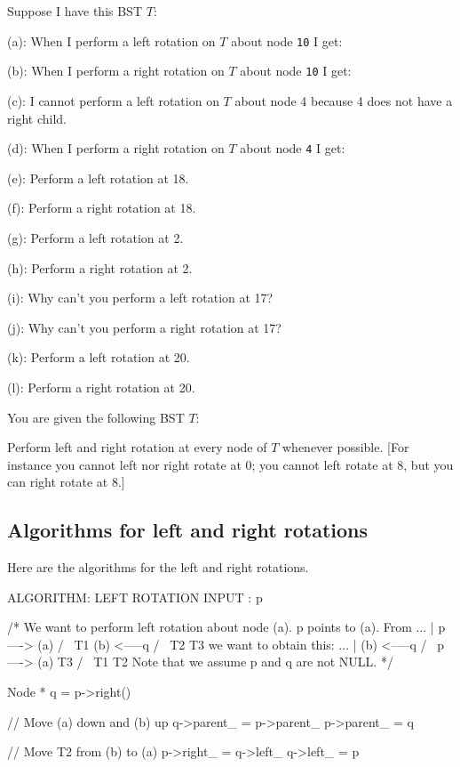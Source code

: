 \begin{eg}
  Suppose I have this BST $T$:
  
  
(a):
When I perform a left rotation on $T$ about node \verb!10! I get:
  

(b):
When I perform a right rotation on $T$ about node \verb!10! I get:
  

(c): I cannot perform a left rotation on $T$ about
node 4 because 4 does not have a right child.

(d):
When I perform a right rotation on $T$ about node \verb!4! I get:


(e): Perform a left rotation at 18.

(f): Perform a right rotation at 18.

(g): Perform a left rotation at 2.

(h): Perform a right rotation at 2.

(i): Why can't you perform a left rotation at 17?

(j): Why can't you perform a right rotation at 17?

(k): Perform a left rotation at 20.

(l): Perform a right rotation at 20.

\end{eg}

\newpage
\begin{ex}
  You are given the following BST $T$:
  
  
Perform left and right rotation at every node of $T$ whenever possible.
[For instance you cannot left nor right rotate at 0; you cannot left rotate at 8, but you can right rotate at 8.] 
\end{ex}



\newpage
\subsection{Algorithms for left and right rotations}

Here are the algorithms for the left and right rotations.

{\small
\begin{console}
ALGORITHM: LEFT ROTATION
INPUT    : p

/* We want to perform left rotation about node (a). p points
to (a). From
                   ...
                    |
            p----> (a)
                   / \
                 T1  (b) <-----q
                     / \
                   T2   T3
we want to obtain this:
                    ...
                     |
                    (b) <-----q
                    / \
           p----> (a)  T3
                  / \
                 T1  T2
Note that we assume p and q are not NULL.
*/

    Node * q = p->right()

    // Move (a) down and (b) up
    q->parent_ = p->parent_  
    p->parent_ = q           

    // Move T2 from (b) to (a)
    p->right_ = q->left_    
    q->left_ = p
\end{console}
}

